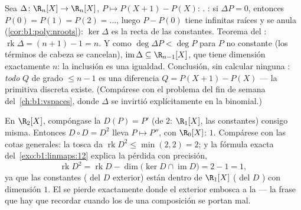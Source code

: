 \begin{example}
\label{ex:b1:linmaps:delta}
Sea $\Delta \colon \R_n[X] \to \R_n[X]$, $P \mapsto P(X+1) - P(X)$:
. : si $\Delta P = 0$, entonces
$P(0) = P(1) = P(2) = \dots$, luego $P - P(0)$ tiene infinitas raíces
y se anula (\cref{cor:b1:poly:nroots}): $\ker\Delta$ es la recta de
las constantes. Teorema del :
$\operatorname{rk}\Delta = (n + 1) - 1 = n$. Y como
$\deg \Delta P < \deg P$ para $P$ no constante (los términos de
cabeza se cancelan), $\operatorname{im}\Delta \subseteq \R_{n-1}[X]$,
que tiene dimensión exactamente $n$: la inclusión es una igualdad.
Conclusión, sin calcular ninguna : \emph{todo}
 $Q$ de grado $\leq n - 1$ es una diferencia
$Q = P(X+1) - P(X)$ --- la primitiva discreta existe. (Compárese con
el problema del fin de semana del~\cref{ch:b1:vspaces}, donde $\Delta$
se invirtió explícitamente en la  binomial.)
\end{example}

\begin{example}
\label{ex:b1:linmaps:rankbookkeeping}
En $\R_2[X]$, compóngase la  $D(P) = P'$ (de  $2$:
 $\R_1[X]$,  las constantes) consigo misma. Entonces
$D \circ D = D^2$ lleva $P \mapsto P''$, con  $\R_0[X]$:
 $1$. Compárese con las cotas generales: la tosca da
$\operatorname{rk} D^2 \leq \min(2, 2) = 2$; y la fórmula exacta
del~\cref{exo:b1:linmaps:12} explica la pérdida con precisión,
\[
\operatorname{rk} D^2 = \operatorname{rk} D -
\dim\bigl(\ker D \cap \operatorname{im} D\bigr) = 2 - 1 = 1 ,
\]
ya que las constantes ( del $D$ exterior) están dentro de
$\R_1[X]$ ( del $D$ ) con dimensión $1$. El  se
pierde exactamente donde el  exterior embosca a la 
 --- la frase que hay que recordar cuando los  de una
composición se portan mal.
\end{example}

